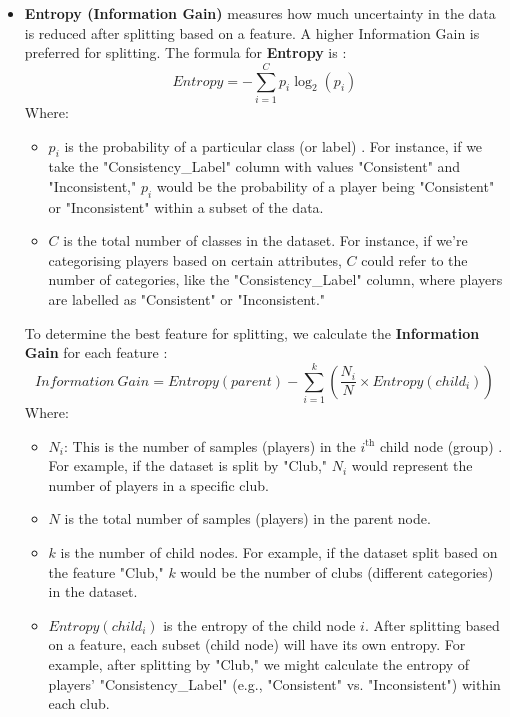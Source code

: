 \documentclass[12pt, a4paper,oneside]{book}
\numberwithin{equation}{section}
\begin{document}
\begin{itemize}
    \item \textbf{Entropy (Information Gain)} measures how much uncertainty in the data is reduced after splitting \cite{neha2024} based on a feature. A higher Information Gain is preferred for splitting.
    The formula for \textbf{Entropy} is \cite{shannon1948} :
    \[
    Entropy = - \sum_{i=1}^{C} p_i \log_2(p_i)
    \]
    Where:
    \begin{itemize}
        \item \( p_i \) is the probability of a particular class (or label) \cite{quinlan1986}. For instance, if we take the "Consistency\_Label" column with values "Consistent" and "Inconsistent," \( p_i \) would be the probability of a player being "Consistent" or "Inconsistent" within a subset of the data.
        \item \( C \) is the total number of classes in the dataset. For instance, if we're categorising players based on certain attributes, \( C \) could refer to the number of categories, like the "Consistency\_Label" column, where players are labelled as "Consistent" or "Inconsistent."
    \end{itemize}

    To determine the best feature for splitting, we calculate the \textbf{Information Gain} for each feature \cite{pranto2020} :
    \[
    Information\ Gain = Entropy(parent) - \sum_{i=1}^{k} \left( \frac{N_i}{N} \times Entropy(child_i) \right)
    \]
    Where:
    \begin{itemize}
        \item \textbf{$N_i$}: This is the number of samples (players) in the $i^{\text{th}}$ child node (group) \cite{quinlan1986}. For example, if the dataset is split by "Club," $N_i$ would represent the number of players in a specific club.
        \item \( N \) is the total number of samples (players) in the parent node.
        \item \( k \) is the number of child nodes. For example, if the dataset split based on the feature "Club," $k$ would be the number of clubs (different categories) in the dataset.
        \item \( Entropy(child_i) \) is the entropy of the child node \( i \). After splitting based on a feature, each subset (child node) will have its own entropy. For example, after splitting by "Club," we might calculate the entropy of players' "Consistency\_Label" (e.g., "Consistent" vs. "Inconsistent") within each club.
    \end{itemize}
\end{itemize}
\end{document}

